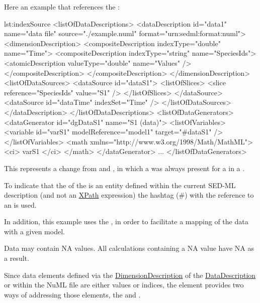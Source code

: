 
Here an example that references the \SedDataSource {}:

\begin{myXmlLst}{}{lst:indexSource}
<listOfDataDescriptions>
  <dataDescription id="data1" name="data file" source="./example.numl" format="urn:sedml:format:numl">
    <dimensionDescription>
      <compositeDescription indexType="double" name="Time">
        <compositeDescription indexType="string" name="SpeciesIds">
          <atomicDescription valueType="double" name="Values" />
        </compositeDescription>
      </compositeDescription>
    </dimensionDescription>
    <listOfDataSources>
      <dataSource id="dataS1">
        <listOfSlices>
          <slice reference="SpeciesIds" value="S1" />
        </listOfSlices>
      </dataSource>
      <dataSource id="dataTime" indexSet="Time" />
    </listOfDataSources>
  </dataDescription>
</listOfDataDescriptions>
<listOfDataGenerators>
  <dataGenerator id="dgDataS1" name="S1 (data)">
    <listOfVariables>
	  <variable id="varS1" modelReference="model1" target="#dataS1" />
    </listOfVariables>
    <math xmlns="http://www.w3.org/1998/Math/MathML">
      <ci> varS1 </ci>
    </math>
  </dataGenerator>
  ...
</listOfDataGenerators>
\end{myXmlLst} 

This represents a change from \LoneVone and \LoneVtwo, in which a  was always present for a  in a \DataGenerator.

To indicate that the \hyperref[sec:target]{} of the \Variable is an entity defined within the current SED-ML description (and not an  \hyperref[sec:xpath]{XPath} expression) the hashtag (\#) with the reference to an \hyperref[type:id]{} is used. 

In addition, this example uses the \hyperref[sec:modelReference]{}, in order to facilitate a mapping of the data with a given model. 

Data may contain NA values. All calculations containing a NA value have NA as a result.

Since data elements defined via the \hyperref[class:dimensionDescription]{DimensionDescription} of the \hyperref[class:dataDescription]{DataDescription} or within the NuML file are either values or indices, the \SedDataSource element provides two ways of addressing those elements, the \hyperref[sec:indexSet]{} and \hyperref[class:listOfSlices]{}. 

